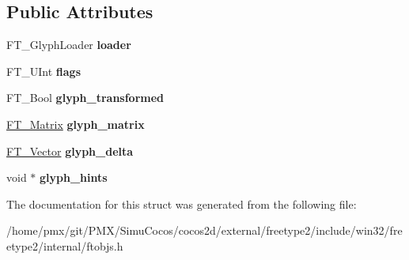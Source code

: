 \subsection*{Public Attributes}
\begin{DoxyCompactItemize}
\item 
\mbox{\label{structFT__Slot__InternalRec___ac57f8c939f667938ab9f986088c15d8f}} 
F\+T\+\_\+\+Glyph\+Loader {\bfseries loader}
\item 
\mbox{\label{structFT__Slot__InternalRec___a9a2a287ba2b363197b36fe24d2f48746}} 
F\+T\+\_\+\+U\+Int {\bfseries flags}
\item 
\mbox{\label{structFT__Slot__InternalRec___ac2bba891ac70016b74c085a05c1f182c}} 
F\+T\+\_\+\+Bool {\bfseries glyph\+\_\+transformed}
\item 
\mbox{\label{structFT__Slot__InternalRec___a95af217daf1c2080692b5a69e345aa3b}} 
\hyperlink{structFT__Matrix__}{F\+T\+\_\+\+Matrix} {\bfseries glyph\+\_\+matrix}
\item 
\mbox{\label{structFT__Slot__InternalRec___a2a94b955dd1e260aaf8699238d44769d}} 
\hyperlink{structFT__Vector__}{F\+T\+\_\+\+Vector} {\bfseries glyph\+\_\+delta}
\item 
\mbox{\label{structFT__Slot__InternalRec___a990b1c2123e4058bdbe6a6ec5a2821a8}} 
void $\ast$ {\bfseries glyph\+\_\+hints}
\end{DoxyCompactItemize}


The documentation for this struct was generated from the following file\+:\begin{DoxyCompactItemize}
\item 
/home/pmx/git/\+P\+M\+X/\+Simu\+Cocos/cocos2d/external/freetype2/include/win32/freetype2/internal/ftobjs.\+h\end{DoxyCompactItemize}
